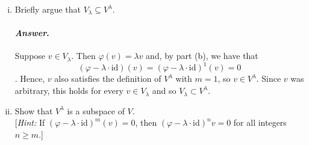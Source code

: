 \documentclass[11pt, reqno]{amsart}
\theoremstyle{plain}
\theoremstyle{definition}
\theoremstyle{example}
\newenvironment{ans}{\medskip \paragraph*{\emph{Answer}.}}{\hfill \break  $~\!\!$ \dotfill \medskip }
\def\id{\mathrm{id}}
\def\f{\varphi}
\begin{document}
\begin{enumerate}[1.]
\begin{enumerate}[(a)]
\begin{enumerate}[(i)]
\begin{ans}
Note that,
\begin{align*}
2 v &= \begin{pmatrix}
0 \\ 2 \\ 0
\end{pmatrix}
\end{align*}

Hence, we have that $\f(v) \neq 2v$, and so $v \not\in V_2$. Now we have,
\begin{align*}
Av - 2v &= \begin{pmatrix}
1 \\ 0 \\ 0
\end{pmatrix}
\end{align*}

And thus,
\begin{align*}
(\f - 2 \cdot \id)(Av - 2v) &= A(Av - 2v) - 2(Av - 2v)\\
&= \begin{pmatrix}
2 \\ 0 \\ 0
\end{pmatrix} - \begin{pmatrix}
2 \\ 0 \\ 0
\end{pmatrix}\\
&= \begin{pmatrix}
0 \\ 0 \\ 0
\end{pmatrix} = 0
\end{align*}

As a result, we have that $(\f - 2 \cdot \id)^2(v) = 0$, and so $v \in V^2$

\end{ans}	
	
\item Briefly argue that $V_\lambda \subseteq V^\lambda$.
\begin{ans}
Suppose $v \in V_{\lambda}$. Then $\f(v) = \lambda v$ and, by part (b), we have that $$(\f - \lambda \cdot \id)(v) = (\f - \lambda \cdot \id)^1(v) = 0$$. Hence, $v$ also satisfies the definition of $V^{\lambda}$ with $m = 1$, so $v \in V^{\lambda}$. Since $v$ was arbitrary, this holds for every $v \in V_{\lambda}$ and so $V_{\lambda} \subset V^{\lambda}$.
\end{ans}
\item Show that $V^\lambda$ is a subspace of $V$. \\
	{[\emph{Hint:} If $(\f - \lambda \cdot \id)^m (v) = 0$, then $(\f - \lambda \cdot \id)^n v = 0$ for all integers $n \ge m$.]}



\end{enumerate}
\end{enumerate}
\end{enumerate}
\end{document}
